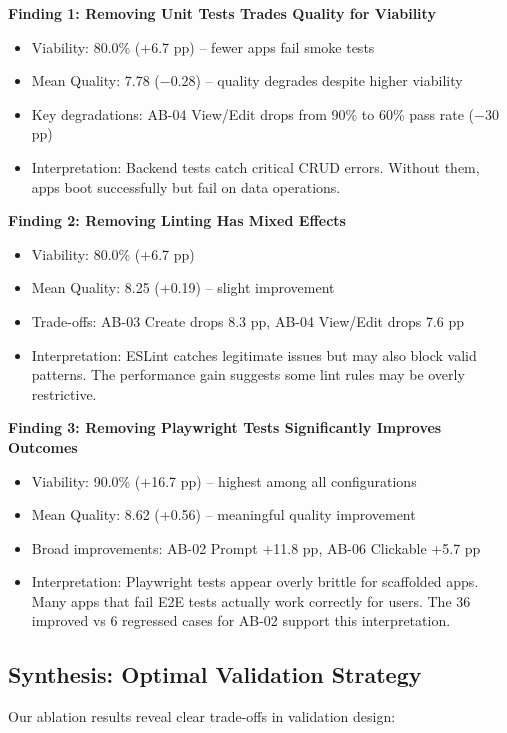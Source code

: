 \documentclass{article}
\begin{document}
\textbf{Finding 1: Removing Unit Tests Trades Quality for Viability}
\begin{itemize}
\item Viability: 80.0\% (+6.7 pp) -- fewer apps fail smoke tests
\item Mean Quality: 7.78 ($-0.28$) -- quality degrades despite higher viability
\item Key degradations: AB-04 View/Edit drops from 90\% to 60\% pass rate ($-30$ pp)
\item Interpretation: Backend tests catch critical CRUD errors. Without them, apps boot successfully but fail on data operations.
\end{itemize}

\textbf{Finding 2: Removing Linting Has Mixed Effects}
\begin{itemize}
\item Viability: 80.0\% (+6.7 pp)
\item Mean Quality: 8.25 (+0.19) -- slight improvement
\item Trade-offs: AB-03 Create drops 8.3 pp, AB-04 View/Edit drops 7.6 pp
\item Interpretation: ESLint catches legitimate issues but may also block valid patterns. The performance gain suggests some lint rules may be overly restrictive.
\end{itemize}

\textbf{Finding 3: Removing Playwright Tests Significantly Improves Outcomes}
\begin{itemize}
\item Viability: 90.0\% (+16.7 pp) -- highest among all configurations
\item Mean Quality: 8.62 (+0.56) -- meaningful quality improvement
\item Broad improvements: AB-02 Prompt +11.8 pp, AB-06 Clickable +5.7 pp
\item Interpretation: Playwright tests appear overly brittle for scaffolded apps. Many apps that fail E2E tests actually work correctly for users. The 36 improved vs 6 regressed cases for AB-02 support this interpretation.
\end{itemize}

\subsection{Synthesis: Optimal Validation Strategy}

Our ablation results reveal clear trade-offs in validation design:
\end{document}
